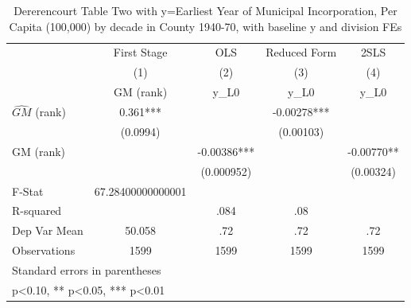 \begin{table}[htbp]\centering
\def\sym#1{\ifmmode^{#1}\else\(^{#1}\)\fi}
\caption{Dererencourt Table Two with y=Earliest Year of Municipal Incorporation, Per Capita (100,000) by decade in County 1940-70, with baseline y and division FEs}
\begin{tabular}{l*{4}{c}}
\toprule
                    & First Stage   &         OLS   &Reduced Form   &        2SLS   \\
                    &\multicolumn{1}{c}{(1)}&\multicolumn{1}{c}{(2)}&\multicolumn{1}{c}{(3)}&\multicolumn{1}{c}{(4)}\\
                    &\multicolumn{1}{c}{GM  (rank)}&\multicolumn{1}{c}{y\_L0}&\multicolumn{1}{c}{y\_L0}&\multicolumn{1}{c}{y\_L0}\\
\midrule
$\hat{GM}$ (rank)   &       0.361***&               &    -0.00278***&               \\
                    &    (0.0994)   &               &   (0.00103)   &               \\
\addlinespace
GM  (rank)          &               &    -0.00386***&               &    -0.00770** \\
                    &               &  (0.000952)   &               &   (0.00324)   \\
\midrule
F-Stat              &67.28400000000001   &               &               &               \\
R-squared           &               &        .084   &         .08   &               \\
Dep Var Mean        &      50.058   &         .72   &         .72   &         .72   \\
Observations        &        1599   &        1599   &        1599   &        1599   \\
\bottomrule
\multicolumn{5}{l}{\footnotesize Standard errors in parentheses}\\
\multicolumn{5}{l}{\footnotesize * p<0.10, ** p<0.05, *** p<0.01}\\
\end{tabular}
\end{table}
